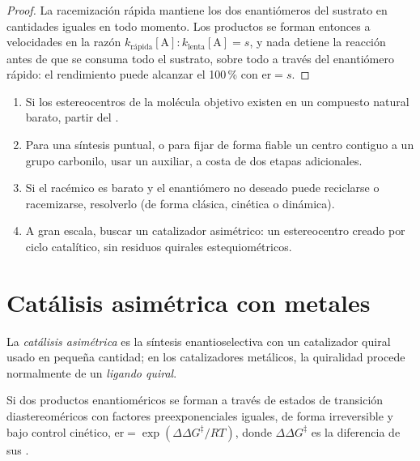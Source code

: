 \begin{proof}
La racemización rápida mantiene los dos enantiómeros del sustrato en cantidades iguales en todo
momento. Los productos se forman entonces a velocidades en la razón $k_{\text{rápida}}[\mathrm A] : k_{\text{lenta}}[\mathrm A] = s$, y nada
detiene la reacción antes de que se consuma todo el sustrato, sobre todo a través del enantiómero rápido:
el rendimiento puede alcanzar el 100\,\% con $\mathrm{er} = s$.
\end{proof}

\begin{method}\label{met:b3:asymmetric-synthesis:strategy}
\begin{enumerate}
  \item Si los estereocentros de la molécula objetivo existen en un compuesto natural barato, partir
        del .
  \item Para una síntesis puntual, o para fijar de forma fiable un centro contiguo a un grupo
        carbonilo, usar un auxiliar, a costa de dos etapas adicionales.
  \item Si el racémico es barato y el enantiómero no deseado puede reciclarse o
        racemizarse, resolverlo (de forma clásica, cinética o dinámica).
  \item A gran escala, buscar un catalizador asimétrico: un estereocentro creado
        por ciclo catalítico, sin residuos quirales estequiométricos.
\end{enumerate}
\end{method}

\section{Catálisis asimétrica con metales}

\begin{definition}\label{def:b3:asymmetric-synthesis:asymmetric-catalysis}
La \emph{catálisis asimétrica} es la síntesis enantioselectiva
con un catalizador quiral usado en pequeña cantidad; en los catalizadores metálicos, la
quiralidad procede normalmente de un \emph{ligando quiral}.
\end{definition}

\begin{theorem}\label{thm:b3:asymmetric-synthesis:er-ddg}
Si dos productos enantioméricos se forman a través de estados de transición diastereoméricos
con factores preexponenciales iguales, de forma irreversible y bajo control cinético,
$\mathrm{er} = \exp(\Delta\Delta G^\ddagger/RT)$, donde $\Delta\Delta G^\ddagger$ es la diferencia de sus .
\end{theorem}

